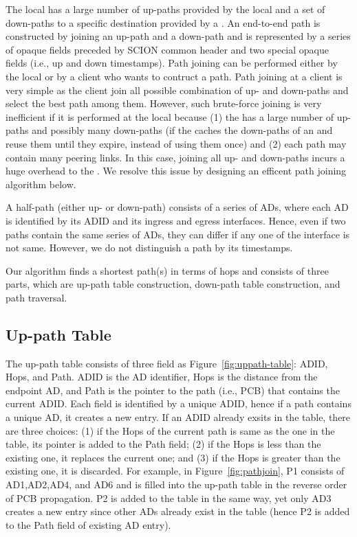 The local \PS has a large number of up-paths provided by the local \BS and a set of down-paths to a specific destination \AD provided by a \ISDC \PS.
An end-to-end path is constructed by joining an up-path and a down-path and is represented by a series of opaque fields preceded by SCION common header and two special opaque fields (i.e., up and down timestamps). Path joining can be performed either by the local \PS or by a client who wants to contruct a path. Path joining at a client is very simple as the client join all possible combination of up- and down-paths and select the best path among them. However, such brute-force joining is very inefficient if it is performed at the local \PS because (1) the \PS has a large number of up-paths and possibly many down-paths (if the \PS caches the down-paths of an \AD and reuse them until they expire, instead of using them once) and (2) each path may contain many peering links. In this case, joining all up- and down-paths incurs a huge overhead to the \PS. We resolve this issue by designing an efficent path joining algorithm below.

A half-path (either up- or down-path) consists of a series of ADs, where each AD is identified by its ADID and its ingress and egress interfaces. Hence, even if two paths contain the same series of ADs, they can differ if any one of the interface is not same. However, we do not distinguish a path by its timestamps.

Our algorithm finds a shortest path(s) in terms of \AD hops and consists of three parts, which are up-path table construction, down-path table construction, and path traversal.

\subsection{Up-path Table}
The up-path table consists of three field as Figure~\ref{fig:uppath-table}: ADID, Hops, and Path. ADID is the AD identifier, Hops is the distance from the endpoint AD, and Path is the pointer to the path (i.e., PCB) that contains the current ADID. Each field is identified by a unique ADID, hence if a path contains a unique AD, it creates a new entry. If an ADID already exsits in the table, there are three choices: (1) if the Hops of the current path is same as the one in the table, its pointer is added to the Path field; (2) if the Hops is less than the existing one, it replaces the current one; and (3) if the Hops is greater than the existing one, it is discarded. For example, in Figure~\ref{fig:pathjoin}, P1 consists of AD1,AD2,AD4, and AD6 and is filled into the up-path table in the reverse order of PCB propagation. P2 is added to the table in the same way, yet only AD3 creates a new entry since other ADs already exist in the table (hence P2 is added to the Path field of existing AD entry).

